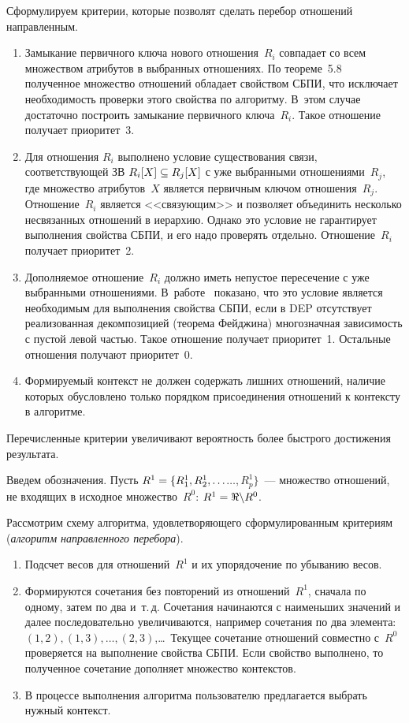 \begin{multicols}{2}
  Сформулируем критерии, которые позволят сделать перебор отношений 
направленным.
  \begin{enumerate}[1.]
\item Замыкание первичного ключа нового отношения~$R_i$ совпадает со всем 
множеством атрибутов в выбранных отношениях. По теореме~5.8~\cite{10-z} 
полученное множество отношений обладает свойством СБПИ, что исключает 
необходимость проверки этого свойства по алгоритму. В~этом случае 
достаточно построить замыкание первичного ключа~$R_i$. Такое отношение 
получает приоритет~3.
\item Для отношения $R_i$ выполнено условие существования связи, 
соответствующей ЗВ $R_i[X]\hm\subseteq R_j[X]$ с уже выбранными 
отношениями~$R_j$, где множество атрибутов~$X$ является первичным 
ключом отношения~$R_j$. Отношение~$R_i$ является <<связующим>> и 
позволяет объединить несколько несвязанных отношений в иерархию. Однако 
это условие не гарантирует выполнения свойства СБПИ, и его надо проверять 
отдельно. Отношение~$R_i$ получает приоритет~2.
\item Дополняемое отношение~$R_i$ должно иметь непустое пересечение с уже 
выбранными отношениями. В~работе~\cite{16-z} показано, что это условие 
является необходимым для выполнения свойства СБПИ, если в DEP 
отсутствует реализованная декомпозицией (теорема Фейджина) многозначная 
зависимость с пустой левой \mbox{частью}. Такое отношение получает приоритет~1. 
Остальные отношения получают приоритет~0.
\item Формируемый контекст не должен содержать лишних отношений, 
наличие которых обуслов\-ле\-но только порядком присоединения отношений к 
контексту в алгоритме.
\end{enumerate}

  Перечисленные критерии увеличивают вероятность более быстрого 
достижения результата.
  
  Введем обозначения. Пусть $R^1\hm= \{ R_1^1, R_2^1, \ldots$\linebreak $\ldots , R_p^1\}$~--- 
множество отношений, не входящих в исходное множество~$R^0$: $R^1\hm= 
\Re\backslash R^0$.
  
  Рассмотрим схему алгоритма, удовлетворяющего сформулированным 
критериям (\textit{алгоритм на\-прав\-лен\-но\-го перебора}).
  \begin{enumerate}[1.]
\item Подсчет весов для отношений~$R^1$ и их упорядочение по убыванию 
весов.
\item Формируются сочетания без повторений из отношений~$R^1$, сначала по 
одному, затем по два и~т.\,д. Сочетания начинаются с наименьших 
значений и далее последовательно увеличиваются, например сочетания по два 
элемента: $(1, 2), (1, 3), \ldots , (2, 3)$,\ldots\ Текущее сочетание отношений 
совместно с~$R^0$ проверяется на выполнение свойства СБПИ. Если свойство 
выполнено, то полученное сочетание дополняет множество контекстов.
\item В процессе выполнения алгоритма пользователю предлагается выбрать 
нужный контекст.
  \end{enumerate}
  

\end{multicols}

